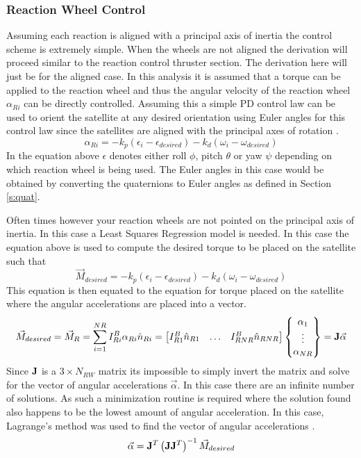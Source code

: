 \documentclass{article}
\begin{document}
\subsubsection{Reaction Wheel Control}

Assuming each reaction is aligned with a principal axis of inertia the
control scheme is extremely simple. When the wheels are not aligned
the derivation will proceed similar to the reaction control thruster
section. The derivation here will just be for the aligned case. In
this analysis it is assumed that a torque can be applied to the
reaction wheel and thus the angular velocity of the reaction wheel
$\alpha_{Ri}$ can be directly controlled. Assuming this a simple PD
control law can be used to orient the satellite at any desired
orientation using Euler angles for this control law since the
satellites are aligned with the principal axes of rotation \cite{etkins}.
\begin{equation}
  \alpha_{Ri} = -k_p(\epsilon_i-\epsilon_{desired})-k_d(\omega_i-\omega_{desired})
\end{equation}
In the equation above $\epsilon$ denotes either roll $\phi$, pitch
$\theta$ or yaw $\psi$ depending on which reaction wheel is being
used. The Euler angles in this case would be obtained by converting
the quaternions to Euler angles as defined in Section \ref{s:quat}.

Often times however your reaction wheels are not pointed on the
principal axis of inertia. In this case a Least Squares Regression
model is needed. In this case the equation above is used to compute
the desired torque to be placed on the satellite such that
\begin{equation}
  \vec{M}_{desired} = -k_p(\epsilon_i-\epsilon_{desired})-k_d(\omega_i-\omega_{desired})
\end{equation}
This equation is then equated to the equation for torque placed on the
satellite where the angular accelerations are placed into a vector.
\begin{equation}
  \vec{M}_{desired} = \vec{M}_R = \sum\limits_{i=1}^{NR}
  I^{B}_{Ri}\alpha_{Ri}\hat{n}_{Ri} = \begin{bmatrix}
    I^{B}_{R1}\hat{n}_{R1} & \hdots &
    I^{B}_{RNR}\hat{n}_{RNR} \end{bmatrix} \begin{Bmatrix} \alpha_1
    \\ \vdots \\ \alpha_{NR} \end{Bmatrix} = {\bf J} \vec{\alpha}
\end{equation}
Since ${\bf J}$ is a $3\times{N_{RW}}$ matrix its impossible to simply
invert the matrix and solve for the vector of angular accelerations
$\vec{\alpha}$. In this case there are an infinite number of
solutions. As such a minimization routine is required where the
solution found also happens to be the lowest amount of angular
acceleration. In this case, Lagrange's method was used to find the
vector of angular accelerations \cite{lagrange}.
\begin{equation}
  \vec{\alpha} = {\bf J}^T\left({\bf J}{\bf J}^T\right)^{-1}\vec{M}_{desired}
\end{equation}
\end{document}
